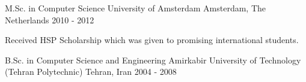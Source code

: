 

\begin{cventries}

  \cventry
    {M.Sc. in Computer Science} %
    {University of Amsterdam} %
    {Amsterdam, The Netherlands} %
    {2010 - 2012} %
    {
      \begin{cvitems} %
        \item {Received HSP Scholarship which was given to promising international students.}
      \end{cvitems}
    }

  \cventry
    {B.Sc. in Computer Science and Engineering} %
    {Amirkabir University of Technology (Tehran Polytechnic)} %
    {Tehran, Iran} %
    {2004 - 2008} %
    {}

\end{cventries}
